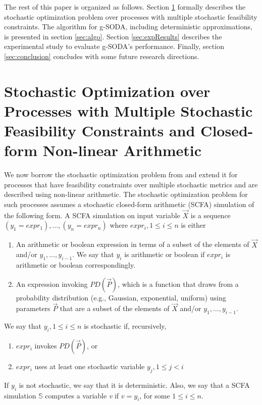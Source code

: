 \documentclass[a4paper, 12pt]{article} %
\begin{document}
The rest of this paper is organized as follows. Section \ref{sec:prob} formally describes the stochastic optimization problem over processes with multiple stochastic feasibility constraints. The algorithm for g-SODA, including deterministic approximations, is presented in section \ref{sec:algo}. Section \ref{sec:expResults} describes the experimental study to evaluate g-SODA's performance. Finally, section \ref{sec:conclusion} concludes with some future research directions. 


\section{Stochastic Optimization over Processes with Multiple Stochastic Feasibility Constraints and Closed-form Non-linear Arithmetic}
\label{sec:prob}

We now borrow the stochastic optimization problem from \cite{GMU-CS-TR-2017-3} and extend it for  processes that have feasibility constraints over multiple stochastic metrics and are described using non-linear arithmetic.
The stochastic optimization problem for such processes assumes a stochastic closed-form arithmetic (SCFA) simulation of the following form.
A SCFA simulation on input variable $\vec{X}$ is a sequence $(y_1=expr_1),\dots,(y_n=expr_n)$
\newline where $expr_i, 1\le i \le n$ is either
\begin{enumerate}[label=(\alph*)]
	\item An arithmetic or boolean expression in terms of a subset of the elements of $\vec{X}$ and/or $y_1,\dots,y_{i-1}$. We say that $y_i$ is arithmetic or boolean if $expr_i$ is arithmetic or boolean correspondingly.
	\item An expression invoking $PD(\vec{P})$, which is a function that draws from a probability distribution (e.g., Gaussian, exponential, uniform) using parameters $\vec{P}$ that are a subset of the elements of $\vec{X}$ and/or $y_1,\dots,y_{i-1}$.
\end{enumerate}
We say that $y_i, 1\le i \le n$ is stochastic if, recursively,
\begin{enumerate}[label=(\alph*)]
	\item $expr_i$ invokes $PD(\vec{P})$, or
	\item $expr_i$ uses at least one stochastic variable $y_j, 1\le j < i$
\end{enumerate}
If $y_i$ is not stochastic, we say that it is deterministic.
Also, we say that a SCFA simulation $\mathbb{S}$  computes a variable \textit{v} if $v=y_i$, for some $1\le i \le n$.
\end{document}
